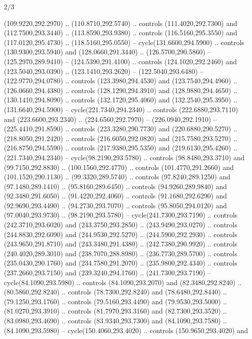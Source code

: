 \begin{flagdescription}{2/3}
\begin{scope}[xshift=0.5\flaglength,yshift=0.5\flagwidth,scale=\stretchfactor]
\begin{scope}[scale=0.001645\flagwidth,yshift=65mm,xshift=-63mm]
\begin{scope}[y=0.80pt, x=0.80pt, yscale=-1,]
\begin{scope}[cm={{1.33333,0.0,0.0,1.33333,(0.0,1e-05)}}]
  (109.9220,292.2970) .. (110.8710,292.5740) .. controls (111.4020,292.7300) and
  (112.7500,293.3440) .. (113.8590,293.9380) .. controls (116.5160,295.3550) and
  (117.0120,295.4730) .. (118.5160,295.0550) -- cycle(131.6600,294.5900) ..
  controls (130.9300,293.5940) and (128.0660,291.3440) .. (126.5700,290.5860) --
  (125.2970,289.9410) -- (124.5390,291.4100) .. controls (124.1020,292.2460) and
  (123.5040,293.0390) .. (123.1410,293.2620) -- (122.5040,293.6480) --
  (122.9770,294.0780) .. controls (123.3980,294.4530) and (123.7540,294.4960) ..
  (126.0660,294.4380) .. controls (128.1290,294.3910) and (128.9880,294.4650) ..
  (130.1410,294.8090) .. controls (132.1720,295.4060) and (132.2540,295.3950) ..
  (131.6640,294.5900) -- cycle(221.7340,294.2340) .. controls
  (222.6880,293.7110) and (223.6600,293.2340) .. (224.6560,292.7970) --
  (226.0940,292.1910) -- (225.4410,291.8590) .. controls (223.3280,290.7730) and
  (220.6880,290.5270) .. (218.8050,291.2420) .. controls (216.6050,292.0820) and
  (215.7580,293.5270) .. (216.8750,294.5590) .. controls (217.9380,295.5350) and
  (219.6130,295.4260) .. (221.7340,294.2340) -- cycle(98.2190,293.5780) ..
  controls (98.8480,293.3710) and (99.7150,292.8830) .. (100.1560,292.4770) ..
  controls (101.4770,291.2660) and (101.1520,290.1130) .. (99.3320,289.5740) ..
  controls (97.8240,289.1250) and (97.1480,289.1410) .. (95.8160,289.6450) ..
  controls (94.9260,289.9840) and (92.3480,291.6050) .. (91.4220,292.4060) ..
  controls (91.1680,292.6290) and (92.9690,293.4490) .. (94.2730,293.7070) ..
  controls (95.8050,294.0120) and (97.0040,293.9730) .. (98.2190,293.5780) --
  cycle(241.7300,293.7190) .. controls (242.3710,293.6020) and
  (243.3750,293.2850) .. (243.9490,293.0270) .. controls (244.8830,292.6090) and
  (244.9530,292.5270) .. (244.5900,292.2930) .. controls (243.9650,291.8710) and
  (243.3480,291.4380) .. (242.7380,290.9920) .. controls (240.4020,289.3010) and
  (238.7070,288.8980) .. (236.7730,289.5700) .. controls (235.0430,290.1760) and
  (234.7580,291.2070) .. (235.9800,292.4340) .. controls (237.2660,293.7150) and
  (239.3240,294.1760) .. (241.7300,293.7190) -- cycle(84.1090,293.5980) ..
  controls (84.1090,293.2070) and (82.3480,292.8240) .. (80.5860,292.8240) ..
  controls (78.7300,292.8240) and (78.6480,292.8440) .. (79.1250,293.1760) ..
  controls (79.5160,293.4490) and (79.9530,293.5000) .. (81.0270,293.3910) ..
  controls (81.7970,293.3160) and (82.7300,293.3520) .. (83.0980,293.4690) ..
  controls (83.9340,293.7300) and (84.1090,293.7580) .. (84.1090,293.5980) --
  cycle(150.4060,293.4020) .. controls (150.9650,293.4020) and

\end{scope}
\end{scope}
\end{scope}
\end{scope}
\end{flagdescription}

